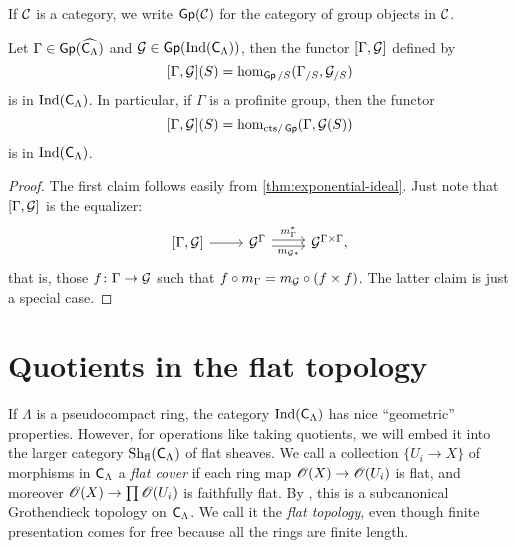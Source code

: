 \documentclass[phd,cornellheadings,draft]{cornell}
\begin{document}
If $\mathcal{C}$ is a category, we write $\operatorname{\mathsf{Gp}}(\mathcal{C})$ for the category of group 
objects in $\mathcal{C}$. 

\begin{corollary}
Let $\Gamma\in \operatorname{\mathsf{Gp}}(\widehat{\mathsf{C}_\Lambda})$ and 
$\mathcal{G}\in \operatorname{\mathsf{Gp}}(\operatorname{Ind}(\mathsf{C}_\Lambda))$, then the functor 
$[\Gamma,\mathcal{G}]$ defined by 
\[
	[\Gamma,\mathcal{G}](S) = \hom_{\operatorname{\mathsf{Gp}}/S}(\Gamma_{/S},\mathcal{G}_{/S}) 
\]
is in $\operatorname{Ind}(\mathsf{C}_\Lambda)$. In particular, if $\Gamma$ is a 
profinite group, then the functor 
\[
	[\Gamma,\mathcal{G}](S) = \hom_{\mathrm{cts}/\operatorname{\mathsf{Gp}}}(\Gamma,\mathcal{G}(S))
\]
is in $\operatorname{Ind}(\mathsf{C}_\Lambda)$. 
\end{corollary}
\begin{proof}
The first claim follows easily from \ref{thm:exponential-ideal}. Just note 
that $[\Gamma,\mathcal{G}]$ is the equalizer:
\[
\begin{tikzcd}
	{[\Gamma,\cG]} \ar[r]
		& \cG^\Gamma \ar[r, "m_\Gamma^\ast", shift left=.5ex] \ar[r, "m_{\cG\ast}"', shift right=.5ex]
		& \cG^{\Gamma\times \Gamma} ,
\end{tikzcd}
\]
that is, those $f\colon \Gamma\to \mathcal{G}$ such that 
$f\circ m_\Gamma = m_{\mathcal{G}}\circ(f\times f)$. The latter claim is just 
a special case. 
\end{proof}





\section{Quotients in the flat topology}

If $\Lambda$ is a pseudocompact ring, the category 
$\operatorname{Ind}(\mathsf{C}_\Lambda)$ has nice ``geometric'' properties. However, 
for operations like taking quotients, we will embed it into the larger category 
$\operatorname{Sh}_{\mathrm{fl}}(\mathsf{C}_\Lambda)$ of flat sheaves. We call a collection 
$\{U_i\to X\}$ of morphisms in $\mathsf{C}_\Lambda$ a \emph{flat cover} if each 
ring map $\mathscr{O}(X)\to \mathscr{O}(U_i)$ is flat, and moreover 
$\mathscr{O}(X)\to \prod \mathscr{O}(U_i)$ is faithfully flat. By \cite[IV 6.3.1]{sga3-1}, this 
is a subcanonical Grothendieck topology on $\mathsf{C}_\Lambda$. We call it the 
\emph{flat topology}, even though finite presentation comes for free because 
all the rings are finite length. 
\end{document}
